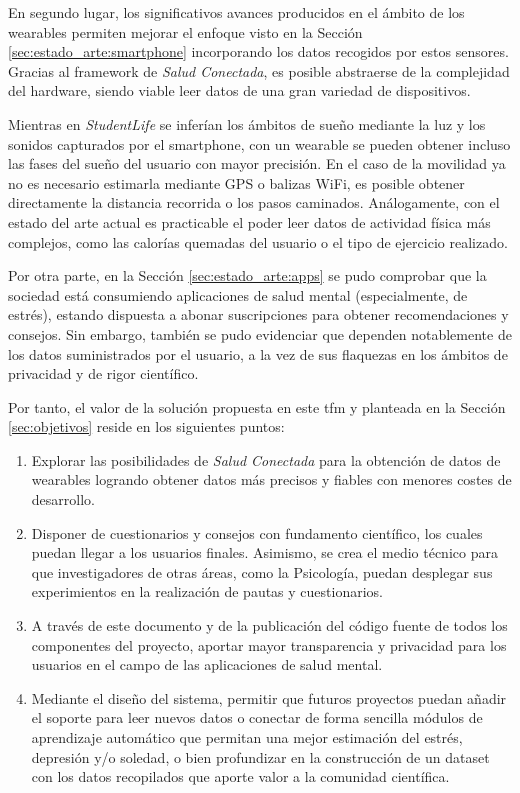     En segundo lugar, los significativos avances producidos en el ámbito de los \glspl{wearable} permiten mejorar el enfoque visto en la Sección \ref{sec:estado_arte:smartphone} incorporando los datos recogidos por estos sensores. Gracias al \gls{framework} de \textit{Salud Conectada}, es posible abstraerse de la complejidad del hardware, siendo viable leer datos de una gran variedad de dispositivos.
    
    Mientras en \textit{StudentLife} se inferían los ámbitos de sueño mediante la luz y los sonidos capturados por el \gls{smartphone}, con un \gls{wearable} se pueden obtener incluso las fases del sueño del usuario con mayor precisión. En el caso de la movilidad ya no es necesario estimarla mediante GPS o balizas WiFi, es posible obtener directamente la distancia recorrida o los pasos caminados. Análogamente, con el estado del arte actual es practicable el poder leer datos de actividad física más complejos, como las calorías quemadas del usuario o el tipo de ejercicio realizado.

    Por otra parte, en la Sección \ref{sec:estado_arte:apps} se pudo comprobar que la sociedad está consumiendo aplicaciones de salud mental (especialmente, de estrés), estando dispuesta a abonar suscripciones para obtener recomendaciones y consejos. Sin embargo, también se pudo evidenciar que dependen notablemente de los datos suministrados por el usuario, a la vez de sus flaquezas en los ámbitos de privacidad y de rigor científico.

    Por tanto, el valor de la solución propuesta en este \gls{tfm} y planteada en la Sección \ref{sec:objetivos} reside en los siguientes puntos:

    \begin{enumerate}
        \item Explorar las posibilidades de \textit{Salud Conectada} para la obtención de datos de \glspl{wearable} logrando obtener datos más precisos y fiables con menores costes de desarrollo.
        \item Disponer de cuestionarios y consejos con fundamento científico, los cuales puedan llegar a los usuarios finales. Asimismo, se crea el medio técnico para que investigadores de otras áreas, como la Psicología, puedan desplegar sus experimientos en la realización de pautas y cuestionarios.
        \item A través de este documento y de la publicación del código fuente de todos los componentes del proyecto, aportar mayor transparencia y privacidad para los usuarios en el campo de las aplicaciones de salud mental.
        \item Mediante el diseño del sistema, permitir que futuros proyectos puedan añadir el soporte para leer nuevos datos o conectar de forma sencilla módulos de aprendizaje automático que permitan una mejor estimación del estrés, depresión y/o soledad, o bien profundizar en la construcción de un \gls{dataset} con los datos recopilados que aporte valor a la comunidad científica.
    \end{enumerate}

